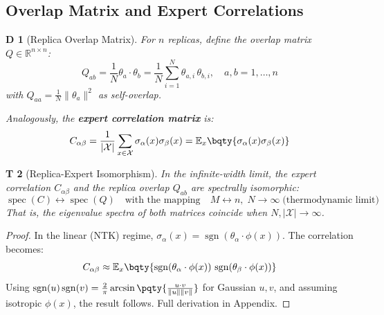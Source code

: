 \documentclass[12pt,a4paper]{article}
\newtheorem{theorem}Theorem[section]
\newtheorem{definition}[theorem]Definition
\newcommand{\R}{\mathbb{R}}
\newcommand{\E}{\mathbb{E}}
\newcommand{\sgn}{\operatorname{sgn}}
\newcommand{\spec}{\operatorname{spec}}
\begin{document}
\subsection{Overlap Matrix and Expert Correlations}
\begin{definition}[Replica Overlap Matrix]
For \(n\) replicas, define the overlap matrix \(Q \in \R^{n \times n}\):
\begin{equation}\label{eq:overlap_matrix}
Q_{ab} = \frac{1}{N} \theta_a \cdot \theta_b = \frac{1}{N} \sum_{i=1}^{N} \theta_{a,i} \, \theta_{b,i}, \quad a,b = 1,\ldots,n
\end{equation}
with \(Q_{aa} = \frac{1}{N}\|\theta_a\|^2\) as self-overlap.

Analogously, the \textbf{expert correlation matrix} is:
\begin{equation}\label{eq:expert_corr}
C_{\alpha\beta} = \frac{1}{|\mathcal{X}|} \sum_{x \in \mathcal{X}} \sigma_\alpha(x) \sigma_\beta(x) = \E_x\bqty{\sigma_\alpha(x) \sigma_\beta(x)}
\end{equation}
\end{definition}

\begin{theorem}[Replica-Expert Isomorphism]\label{thm:overlap_corr}
In the infinite-width limit, the expert correlation \(C_{\alpha\beta}\) and the replica overlap \(Q_{ab}\) are spectrally isomorphic:
\begin{equation}\label{eq:spectral_corr}
\spec(C) \leftrightarrow \spec(Q) \quad \text{with the mapping} \quad M \leftrightarrow n, \; N \to \infty \;\text{(thermodynamic limit)}
\end{equation}
That is, the eigenvalue spectra of both matrices coincide when \(N, |\mathcal{X}| \to \infty\).
\end{theorem}

\begin{proof}
In the linear (NTK) regime, \(\sigma_\alpha(x) = \sgn(\theta_\alpha \cdot \phi(x))\). The correlation becomes:
\begin{equation}
C_{\alpha\beta} \approx \E_x\bqty{\sgn(\theta_\alpha \cdot \phi(x)) \, \sgn(\theta_\beta \cdot \phi(x))}
\end{equation}
Using \(\sgn(u)\sgn(v) = \frac{2}{\pi} \arcsin\pqty{\frac{u \cdot v}{\|u\|\|v\|}}\) for Gaussian \(u, v\), and assuming isotropic \(\phi(x)\), the result follows. Full derivation in Appendix.
\end{proof}
\end{document}
